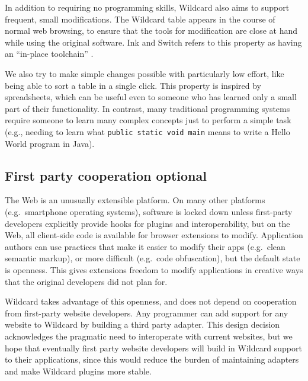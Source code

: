 \documentclass[english,submission]{programming}
\begin{document}
In addition to requiring no programming skills, Wildcard also aims to
support frequent, small modifications. The Wildcard table appears in the
course of normal web browsing, to ensure that the tools for modification
are close at hand while using the original software. Ink and Switch
refers to this property as having an ``in-place toolchain''
\autocite{inkandswitch2019}.

We also try to make simple changes possible with particularly low
effort, like being able to sort a table in a single click. This property
is inspired by spreadsheets, which can be useful even to someone who has
learned only a small part of their functionality. In contrast, many
traditional programming systems require someone to learn many complex
concepts just to perform a simple task (e.g., needing to learn what
\texttt{public\ static\ void\ main} means to write a Hello World program
in Java).

\hypertarget{first-party-cooperation-optional}{%
\subsection{First party cooperation
optional}\label{first-party-cooperation-optional}}

The Web is an unusually extensible platform. On many other platforms
(e.g.~smartphone operating systems), software is locked down unless
first-party developers explicitly provide hooks for plugins and
interoperability, but on the Web, all client-side code is available for
browser extensions to modify. Application authors can use practices that
make it easier to modify their apps (e.g.~clean semantic markup), or
more difficult (e.g.~code obfuscation), but the default state is
openness. This gives extensions freedom to modify applications in
creative ways that the original developers did not plan for.

Wildcard takes advantage of this openness, and does not depend on
cooperation from first-party website developers. Any programmer can add
support for any website to Wildcard by building a third party adapter.
This design decision acknowledges the pragmatic need to interoperate
with current websites, but we hope that eventually first party website
developers will build in Wildcard support to their applications, since
this would reduce the burden of maintaining adapters and make Wildcard
plugins more stable.
\end{document}
